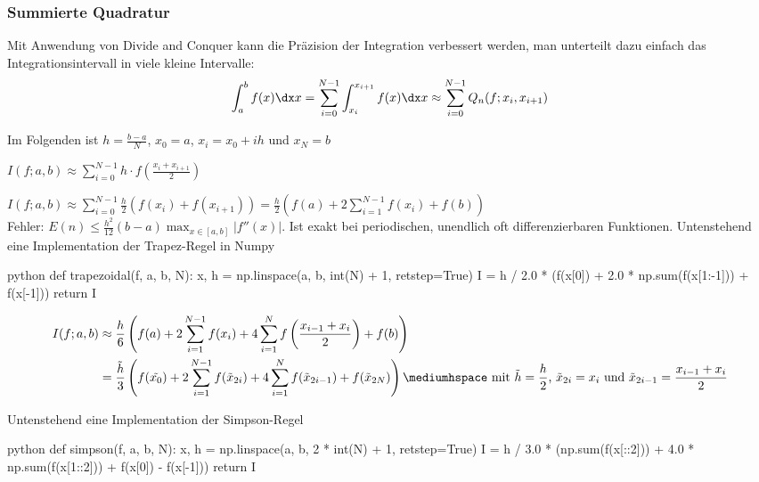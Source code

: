 \drmvspace
\subsubsection{Summierte Quadratur}
Mit Anwendung von Divide and Conquer kann die Präzision der Integration verbessert werden, man unterteilt dazu einfach das Integrationsintervall in viele kleine Intervalle:
\rmvspace
\begin{align*}
    \int_{a}^{b} f(x) \dx x = \sum_{i = 0}^{N - 1} \int_{x_i}^{x_{i + 1}} f(x) \dx x \approx \sum_{i = 0}^{N - 1} Q_n (f; x_i, x_{i + 1})
\end{align*}

\drmvspace
Im Folgenden ist $h = \frac{b - a}{N}$, $x_0 = a$, $x_i = x_0 + ih$ und $x_N = b$

$\displaystyle I(f; a, b) \approx \sum_{i = 0}^{N - 1} h \cdot f \left( \frac{x_i + x_{i + 1}}{2} \right)$

$\displaystyle I(f; a, b) \approx \sum_{i = 0}^{N - 1} \frac{h}{2} (f(x_i) + f(x_{i + 1})) = \frac{h}{2} \left( f(a) + 2 \sum_{i = 1}^{N - 1} f(x_i) + f(b) \right)$\\
Fehler: $\displaystyle E(n) \leq \frac{h^2}{12} (b - a) \max_{x \in [a, b]} |f''(x)|$. Ist exakt bei periodischen, unendlich oft differenzierbaren Funktionen.
Untenstehend eine Implementation der Trapez-Regel in Numpy

\rmvspace
\begin{code}{python}
def trapezoidal(f, a, b, N):
    x, h = np.linspace(a, b, int(N) + 1, retstep=True)
    I = h / 2.0 * (f(x[0]) + 2.0 * np.sum(f(x[1:-1])) + f(x[-1]))
    return I
\end{code}

\newpage
{}
\rmvspace
\begin{align*}
    I(f; a, b) & \approx \frac{h}{6} \left( f(a) + 2 \sum_{i = 1}^{N - 1} f(x_i) + 4 \sum_{i = 1}^{N} f\left( \frac{x_{i - 1} + x_i}{2} \right) + f(b) \right)                 \\
               & = \frac{\tilde{h}}{3} \left( f(\tilde{x_0}) + 2 \sum_{i = 1}^{N - 1} f(\tilde{x}_{2i}) + 4 \sum_{i = 1}^{N} f(\tilde{x}_{2i - 1}) + f(\tilde{x}_{2N}) \right)
    \mediumhspace \text{ mit } \tilde{h} = \frac{h}{2} \text{, } \tilde{x}_{2i} = x_i \text{ und } \tilde{x}_{2i - 1} = \frac{x_{i - 1} + x_i}{2}
\end{align*}

\drmvspace Untenstehend eine Implementation der Simpson-Regel
\begin{code}{python}
def simpson(f, a, b, N):
    x, h = np.linspace(a, b, 2 * int(N) + 1, retstep=True)
    I = h / 3.0 * (np.sum(f(x[::2])) + 4.0 * np.sum(f(x[1::2])) + f(x[0]) - f(x[-1]))
    return I
\end{code}
